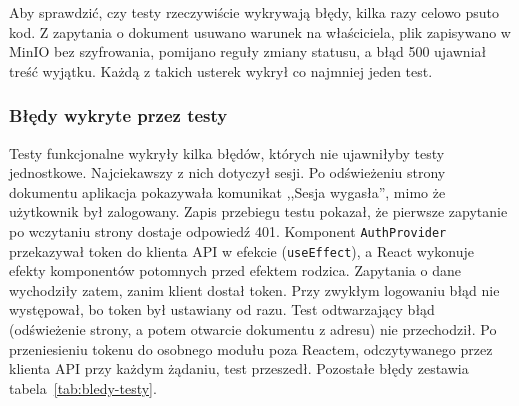 Aby sprawdzić, czy testy rzeczywiście wykrywają błędy, kilka razy celowo
psuto kod. Z zapytania o dokument usuwano warunek na właściciela, plik
zapisywano w MinIO bez szyfrowania, pomijano reguły zmiany statusu, a błąd
500 ujawniał treść wyjątku. Każdą z takich usterek wykrył co najmniej jeden
test.

\subsubsection{Błędy wykryte przez testy}

Testy funkcjonalne wykryły kilka błędów, których nie ujawniłyby testy
jednostkowe. Najciekawszy z nich dotyczył sesji. Po odświeżeniu strony
dokumentu aplikacja pokazywała komunikat ,,Sesja wygasła'', mimo że
użytkownik był zalogowany. Zapis przebiegu testu pokazał, że pierwsze
zapytanie po wczytaniu strony dostaje odpowiedź 401. Komponent
\texttt{AuthProvider} przekazywał token do klienta API w efekcie
(\texttt{useEffect}), a React wykonuje efekty komponentów potomnych przed
efektem rodzica. Zapytania o dane wychodziły zatem, zanim klient dostał token.
Przy zwykłym logowaniu błąd nie występował, bo token był ustawiany od razu.
Test odtwarzający błąd (odświeżenie strony, a potem otwarcie dokumentu
z adresu) nie przechodził. Po przeniesieniu tokenu do osobnego modułu poza
Reactem, odczytywanego przez klienta API przy każdym żądaniu, test przeszedł.
Pozostałe błędy zestawia tabela~\ref{tab:bledy-testy}.

